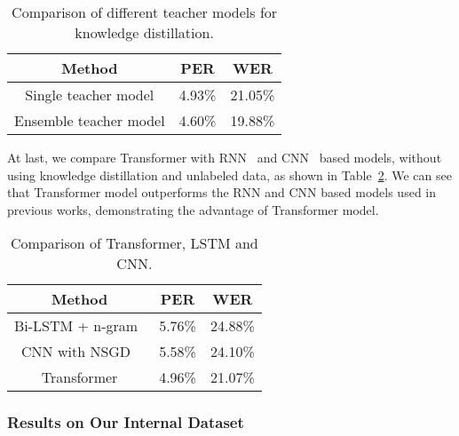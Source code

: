 \documentclass[a4paper]{article}
\begin{document}
\vspace{-0.1cm}
\begin{table}[!htb]
  \caption{Comparison of different teacher models for knowledge distillation.}
  \label{tab:result-ensemble}
  \centering
  \begin{tabular}{ccc}
   \toprule
    \textbf{Method}                     & \textbf{PER} &\textbf{WER}          \\
    \midrule
      Single teacher model      &4.93\%&21.05\%        \\
      Ensemble teacher model   &4.60\%&19.88\%            \\
    \bottomrule
  \end{tabular}
\end{table}
\vspace{-0.3cm}
At last, we compare Transformer with RNN~\cite{milde2017multitask} and CNN~\cite{chae2018convolutional} based models, without using knowledge distillation and unlabeled data, as shown in Table~\ref{tab:transformer}. We can see that Transformer model outperforms the RNN and CNN based models used in previous works, demonstrating the advantage of Transformer model.
\vspace{-0.1cm}
\begin{table}[th]
  \caption{Comparison of Transformer, LSTM and CNN.}
  \label{tab:transformer}
  \centering
  \begin{tabular}{ccc}
   \toprule
    \textbf{Method}                     & \textbf{PER} &\textbf{WER}          \\
    \midrule
     Bi-LSTM + n-gram~\cite{milde2017multitask}    &5.76\%&24.88\%           \\
     CNN with NSGD~\cite{chae2018convolutional}                     &5.58\%&24.10\%          \\
      Transformer                     &4.96\%&21.07\%           \\
    \bottomrule
  \end{tabular}
  \end{table}
\vspace{-0.5cm}

\subsubsection{Results on Our Internal Dataset}
\end{document}
